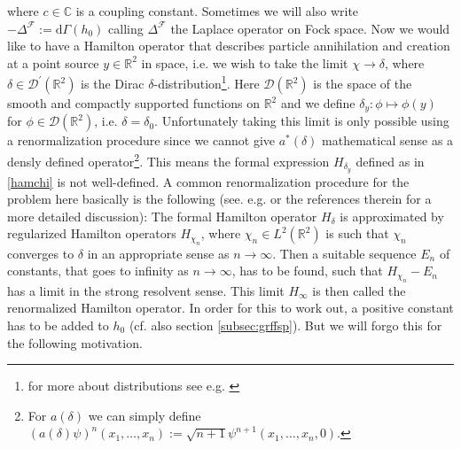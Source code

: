 where $c \in \mathbb{C}$ is a coupling constant. Sometimes we will also write $-\Delta^{\mathcal{F}} := \mathrm{d}\Gamma(h_{0})$ calling $\Delta^{\mathcal{F}}$ the Laplace operator on Fock space. Now we would like to have a Hamilton operator that describes particle annihilation and creation at a point source $y \in \mathbb{R}^{2}$ in space, i.e. we wish to take the limit $\chi \to \delta$, where $\delta \in \mathcal{D}^{\prime}(\mathbb{R}^{2})$ is the Dirac $\delta$-distribution\footnote{for more about distributions see e.g. \cite{0b69015e}}. Here $\mathcal{D}(\mathbb{R}^{2})$ is the space of the smooth and compactly supported functions on $\mathbb{R}^{2}$ and we define $\delta_{y} \colon \phi \mapsto \phi(y)$ for $\phi \in \mathcal{D}(\mathbb{R}^{2})$, i.e. $\delta = \delta_{0}$. Unfortunately taking this limit is only possible using a renormalization procedure since we cannot give $a^{\ast}(\delta)$ mathematical sense as a densly defined operator\footnote{For $a(\delta)$ we can simply define $(a(\delta)\psi)^{n}(x_{1},\dots,x_{n}) := \sqrt{n + 1}\psi^{n + 1}(x_{1},\dots,x_{n},0)$.}. This means the formal expression $H_{\delta_{y}}$ defined as in \eqref{hamchi} is not well-defined. A common renormalization procedure for the problem here basically is the following (see. e.g. \cite{7f9f7f95} or the references therein for a more detailed discussion): The formal Hamilton operator $H_{\delta}$ is approximated by regularized Hamilton operators $H_{\chi_{n}}$, where $\chi_{n} \in L^{2}(\mathbb{R}^{2})$ is such that $\chi_{n}$ converges to $\delta$ in an appropriate sense as $n \to \infty$. Then a suitable sequence $E_{n}$ of constants, that goes to infinity as $n \to \infty$, has to be found, such that $H_{\chi_{n}} - E_{n}$ has a limit in the strong resolvent sense. This limit $H_{\infty}$ is then called the renormalized Hamilton operator. In order for this to work out, a positive constant has to be added to $h_{0}$ (cf. also section \ref{subsec:grffsp}). But we will forgo this for the following motivation.
